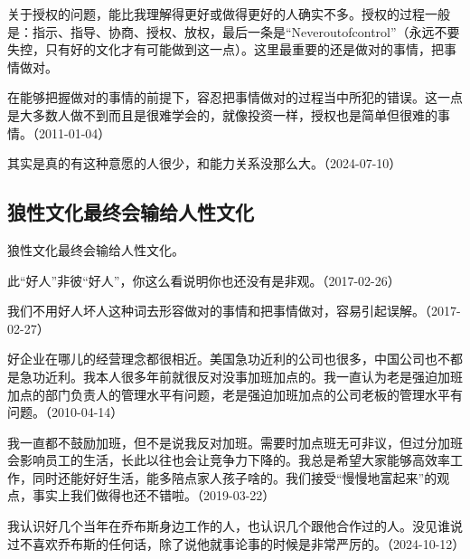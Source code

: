 
关于授权的问题，能比我理解得更好或做得更好的人确实不多。授权的过程一般是：指示、指导、协商、授权、放权，最后一条是“Neveroutofcontrol”（永远不要失控，只有好的文化才有可能做到这一点）。这里最重要的还是做对的事情，把事情做对。

在能够把握做对的事情的前提下，容忍把事情做对的过程当中所犯的错误。这一点是大多数人做不到而且是很难学会的，就像投资一样，授权也是简单但很难的事情。（2011-01-04）


其实是真的有这种意愿的人很少，和能力关系没那么大。（2024-07-10）

\subsection{狼性文化最终会输给人性文化}


狼性文化最终会输给人性文化。

此“好人”非彼“好人”，你这么看说明你也还没有是非观。（2017-02-26）

我们不用好人坏人这种词去形容做对的事情和把事情做对，容易引起误解。（2017-02-27）


好企业在哪儿的经营理念都很相近。美国急功近利的公司也很多，中国公司也不都是急功近利。我本人很多年前就很反对没事加班加点的。我一直认为老是强迫加班加点的部门负责人的管理水平有问题，老是强迫加班加点的公司老板的管理水平有问题。（2010-04-14）

我一直都不鼓励加班，但不是说我反对加班。需要时加点班无可非议，但过分加班会影响员工的生活，长此以往也会让竞争力下降的。我总是希望大家能够高效率工作，同时还能好好生活，能多陪点家人孩子啥的。我们接受“慢慢地富起来”的观点，事实上我们做得也还不错啦。（2019-03-22）


我认识好几个当年在乔布斯身边工作的人，也认识几个跟他合作过的人。没见谁说过不喜欢乔布斯的任何话，除了说他就事论事的时候是非常严厉的。（2024-10-12）

